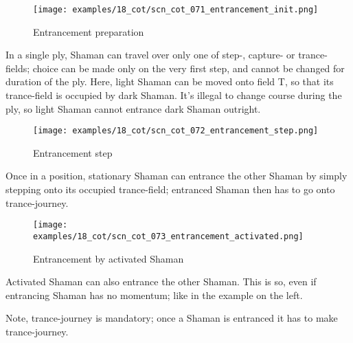 \vspace*{-0.9\baselineskip}
\noindent
\begin{wrapfigure}[13]{l}{0.4\textwidth}
\centering
\texttt{[image: examples/18\_cot/scn\_cot\_071\_entrancement\_init.png]}
\vspace*{-0.4\baselineskip}
\caption{Entrancement preparation}
\label{fig:scn_cot_071_entrancement_init}
\end{wrapfigure}
In a single ply, Shaman can travel over only one of step-, capture- or trance-fields;
choice can be made only on the very first step, and cannot be changed for duration of
the ply.\newline
\indent
Here, light Shaman can be moved onto field T, so that its trance-field is occupied by
dark Shaman. It's illegal to change course during the ply, so light Shaman cannot
entrance dark Shaman outright.

\clearpage %

\noindent
\begin{wrapfigure}[6]{l}{0.4\textwidth}
\centering
\texttt{[image: examples/18\_cot/scn\_cot\_072\_entrancement\_step.png]}
\vspace*{-0.4\baselineskip}
\caption{Entrancement step}
\label{fig:scn_cot_072_entrancement_step}
\end{wrapfigure}
Once in a position, stationary Shaman can entrance the other Shaman by simply stepping
onto its occupied trance-field; entranced Shaman then has to go onto trance-journey.

\vspace*{5.1\baselineskip}

\noindent
\begin{wrapfigure}[8]{l}{0.4\textwidth}
\centering
\texttt{[image: examples/18\_cot/scn\_cot\_073\_entrancement\_activated.png]}
\vspace*{-0.4\baselineskip}
\caption{Entrancement by activated Shaman}
\label{fig:scn_cot_073_entrancement_activated}
\end{wrapfigure}
Activated Shaman can also entrance the other Shaman. This is so, even if entrancing
Shaman has no momentum; like in the example on the left.

Note, trance-journey is mandatory; once a Shaman is entranced it has to make
trance-journey.

\clearpage %

